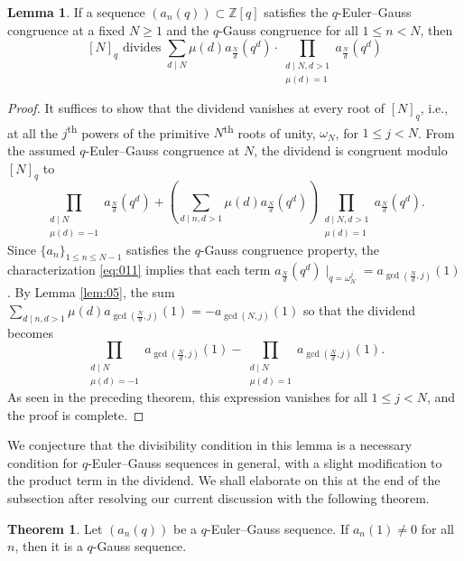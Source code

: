 \documentclass{article}
\numberwithin{equation}{section}
\theoremstyle{definition}
\newtheorem{lemma}[definition]{\bf {Lemma}}
\newtheorem{theorem}[definition]{\bf {Theorem}}
\begin{document}
\begin{lemma}\label{lem:02}
    If a sequence $(a_n(q))\subset\mathbb{Z}[q]$ satisfies the $q$-Euler--Gauss congruence at a fixed $N\geq1$ and the $q$-Gauss congruence for all $1\leq n<N$, then 
    \[
        [N]_q\text{ divides } \sum_{d\mid N} \mu(d)a_{\frac{N}{d}}(q^d)\cdot\prod_{\substack{d\mid N, d>1\\\mu(d)=1}} a_{\frac{N}{d}}(q^d)
    \]
\end{lemma}
\begin{proof}
    It suffices to show that the dividend vanishes at every root of $[N]_q$, i.e., at all the $j$\textsuperscript{th} powers of the primitive $N$\textsuperscript{th} roots of unity, $\omega_N$, for $1\leq j<N$. From the assumed $q$-Euler--Gauss congruence at $N$, the dividend is congruent modulo $[N]_q$ to 
    \[\prod_{\substack{d\mid N\\\mu(d)=-1}}a_\frac{N}{d}(q^d)+\left(\sum_{d\mid n, d>1}\mu(d)a_\frac{N}{d}(q^d)\right)\prod_{\substack{d\mid N, d>1\\\mu(d)=1}}a_\frac{N}{d}(q^d).\]
    Since $\{a_n\}_{1\leq n\leq N-1}$ satisfies the $q$-Gauss congruence property, the characterization \eqref{eq:011} implies that each term $a_\frac{N}{d}(q^d)\mid_{q=\omega_N^j}=a_{\gcd(\frac{N}{d},j)}(1)$. By Lemma \ref{lem:05}, the sum $\sum_{d\mid n, d>1}\mu(d)a_{\gcd(\frac{N}{d},j)}(1)=-a_{\gcd(N,j)}(1)$ so that the dividend becomes 
    \[\prod_{\substack{d\mid N\\\mu(d)=-1}}a_{\gcd(\frac{N}{d},j)}(1)-\prod_{\substack{d\mid N\\\mu(d)=1}}a_{\gcd(\frac{N}{d},j)}(1).\]
    As seen in the preceding theorem, this expression vanishes for all $1\leq j<N$, and the proof is complete. 
\end{proof}
 We conjecture that the divisibility condition in this lemma is a necessary condition for $q$-Euler--Gauss sequences in general, with a slight modification to the product term in the dividend. We shall elaborate on this at the end of the subsection after resolving our current discussion with the following theorem.  
\begin{theorem}\label{thm:1} 
    Let $(a_n(q))$ be a $q$-Euler--Gauss sequence. If $a_{n}(1)\neq0$ for all $n$, then it is a $q$-Gauss sequence.
\end{theorem}
\end{document}

